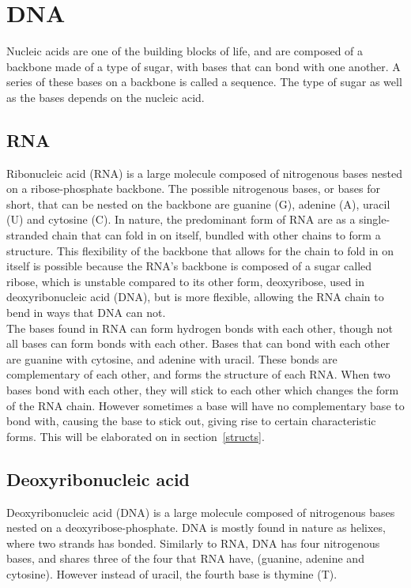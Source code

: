 \section{DNA}
Nucleic acids are one of the building blocks of life, and are composed of a 
backbone made of a type of sugar, with bases that can bond with one another. 
A series of these bases on a backbone is called a sequence. The 
type of sugar as well as the bases depends on the nucleic acid. 
\subsection{RNA} %
Ribonucleic acid (RNA) is a large molecule composed of nitrogenous 
bases nested on a ribose-phosphate backbone. The possible nitrogenous bases, or 
bases for short, 
that can be nested on the backbone are guanine (G), adenine (A), uracil (U) and cytosine 
(C). In nature, the predominant form of RNA are as a single-stranded chain 
that can fold in on itself, bundled with other chains to form a structure. 
This flexibility of the backbone that allows for the chain to fold in on itself 
is possible because the RNA's backbone is composed of a sugar called ribose, 
which is unstable compared to its other form, deoxyribose, used in 
deoxyribonucleic acid (DNA), but is more flexible, allowing the RNA chain to 
bend in ways that DNA can not.\\

The bases found in RNA can form hydrogen bonds with each other, though not all 
bases can form bonds with each other. Bases that can bond with each other are 
guanine with cytosine, and adenine with uracil. These bonds are complementary 
of each other, and forms the structure of each RNA. When 
two bases bond with each other, they will stick to each other 
which changes the form of the RNA chain. However sometimes a base will have no 
complementary base to bond with, causing the base to stick out, giving rise to 
certain characteristic forms. This will be elaborated on in section~\ref{structs}.

\subsection{Deoxyribonucleic acid}
Deoxyribonucleic acid (DNA) is a large molecule composed of nitrogenous bases 
nested on a deoxyribose-phosphate. DNA is mostly found in nature as helixes, 
where two strands has bonded. Similarly to RNA, DNA has four nitrogenous 
bases, and shares three of the four that RNA have, (guanine, adenine and cytosine). 
However instead of uracil, the fourth base is thymine (T). 

